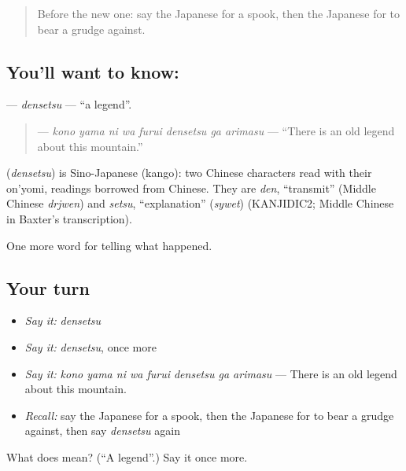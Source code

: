 \begin{quote}
Before the new one: say the Japanese for a spook, then the Japanese for to bear a grudge against.
\end{quote}

\subsection*{You'll want to know: }
\textbf{} — \emph{densetsu} — \textquotedblleft{}a legend\textquotedblright{}.

\begin{quote}
\textbf{    } — \emph{kono yama ni wa furui densetsu ga arimasu} — \textquotedblleft{}There is an old legend about this mountain.\textquotedblright{}
\end{quote}

\begin{cousinweb}
\textbf{} (\emph{densetsu}) is Sino-Japanese (kango): two Chinese characters read with their on'yomi, readings borrowed from Chinese. They are \emph{den}, \textquotedblleft{}transmit\textquotedblright{} (Middle Chinese \emph{drjwen}) and \emph{setsu}, \textquotedblleft{}explanation\textquotedblright{} (\emph{sywet}) (KANJIDIC2; Middle Chinese in Baxter's transcription).
\end{cousinweb}

\begin{grammarlens}[title={What you've built}]
One more word for telling what happened.
\end{grammarlens}

\subsection*{Your turn}
\begin{itemize}
\raggedright
  \item \emph{Say it:} \emph{densetsu}
  \item \emph{Say it:} \emph{densetsu}, once more
  \item \emph{Say it:} \emph{kono yama ni wa furui densetsu ga arimasu} — There is an old legend about this mountain.
  \item \emph{Recall:} say the Japanese for a spook, then the Japanese for to bear a grudge against, then say \emph{densetsu} again
\end{itemize}

\begin{tcolorbox}[breakable,colback=teal!4,colframe=teal!35!black,title={Before you move on}]
What does  mean? (\textquotedblleft{}A legend\textquotedblright{}.) Say it once more.
\end{tcolorbox}
